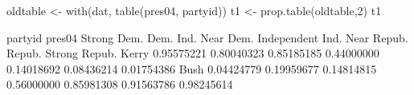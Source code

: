 \begin{Schunk}
\begin{Sinput}
 oldtable <- with(dat, table(pres04, partyid))
 t1 <- prop.table(oldtable,2)
 t1
\end{Sinput}
\begin{Soutput}
       partyid
pres04  Strong Dem.       Dem. Ind. Near Dem. Independent Ind. Near Repub.     Repub. Strong Repub.
  Kerry  0.95575221 0.80040323     0.85185185  0.44000000       0.14018692 0.08436214    0.01754386
  Bush   0.04424779 0.19959677     0.14814815  0.56000000       0.85981308 0.91563786    0.98245614
\end{Soutput}
\end{Schunk}
